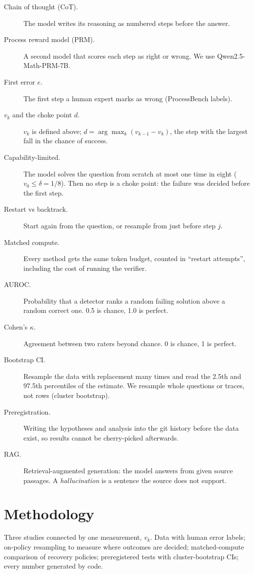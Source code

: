 \documentclass[11pt,a4paper]{article}
\begin{document}
\begin{description}
\item[Chain of thought (CoT).] The model writes its reasoning as numbered steps before the answer.
\item[Process reward model (PRM).] A second model that scores each step as right or wrong. We use
Qwen2.5-Math-PRM-7B.
\item[First error $e$.] The first step a human expert marks as wrong (ProcessBench labels).
\item[$v_k$ and the choke point $d$.] $v_k$ is defined above; $d=\arg\max_k (v_{k-1}-v_k)$, the step
with the largest fall in the chance of success.
\item[Capability-limited.] The model solves the question from scratch at most one time in eight
($v_0\le\delta=1/8$). Then no step is a choke point: the failure was decided before the first step.
\item[Restart vs backtrack.] Start again from the question, or resample from just before step $j$.
\item[Matched compute.] Every method gets the same token budget, counted in ``restart attempts'',
including the cost of running the verifier.
\item[AUROC.] Probability that a detector ranks a random failing solution above a random correct
one. 0.5 is chance, 1.0 is perfect.
\item[Cohen's $\kappa$.] Agreement between two raters beyond chance. 0 is chance, 1 is perfect.
\item[Bootstrap CI.] Resample the data with replacement many times and read the 2.5th and 97.5th
percentiles of the estimate. We resample whole questions or traces, not rows (cluster bootstrap).
\item[Preregistration.] Writing the hypotheses and analysis into the git history before the data
exist, so results cannot be cherry-picked afterwards.
\item[RAG.] Retrieval-augmented generation: the model answers from given source passages. A
\emph{hallucination} is a sentence the source does not support.
\end{description}

\section{Methodology}\label{sec:method}
\begin{viva}
Three studies connected by one measurement, $v_k$. Data with human error labels; on-policy
resampling to measure where outcomes are decided; matched-compute comparison of recovery policies;
preregistered tests with cluster-bootstrap CIs; every number generated by code.
\end{viva}
\end{document}
